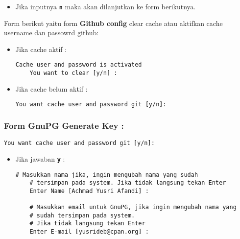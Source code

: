 {\begin{itemize}
\begin{lstlisting}[language=ShellBash]
	# Masukkan email github, jika ingin mengubah nama yang sudah
	# tersimpan pada system. Jika tidak langsung tekan Enter
	Enter your github email [linuxer08@gmail.com] : 
	
	# Jika cache sudah aktif, maka form berikut akan tampil
	# jika cache belum aktif, maka form yang tampil yaitu :
	# "You want cache user and password git [y/n]:"
	# 
	# Jawaban hanya "y" or "n", jika dikosongkan 
	# maka sama dengan "n"
	You want to clear [y/n] : 
	\end{lstlisting}
	
	\item Jika inputnya \textbf{\texttt{n}} maka akan dilanjutkan ke form berikutnya.
\end{itemize}

\noindent
Form berikut yaitu form \textbf{Github config} clear cache atau aktifkan cache username dan passowrd github:

\begin{itemize}
	\item Jika cache aktif :
	\begin{lstlisting}[language=ShellBash]
	Cache user and password is activated
	You want to clear [y/n] : 
	\end{lstlisting}
	
	\item Jika cache belum aktif :
	\begin{lstlisting}[language=ShellBash]
	You want cache user and password git [y/n]: 
	\end{lstlisting}
\end{itemize}

\subsubsection{Form GnuPG Generate Key :}

\begin{lstlisting}[language=ShellBash]
You want cache user and password git [y/n]: 
\end{lstlisting}

\begin{itemize}
	\item Jika jawaban \textbf{\texttt{y}} :
	\begin{lstlisting}[language=ShellBash]
	# Masukkan nama jika, ingin mengubah nama yang sudah
	# tersimpan pada system. Jika tidak langsung tekan Enter
	Enter Name [Achmad Yusri Afandi] : 
	
	# Masukkan email untuk GnuPG, jika ingin mengubah nama yang
	# sudah tersimpan pada system. 
	# Jika tidak langsung tekan Enter
	Enter E-mail [yusrideb@cpan.org] : 
	\end{lstlisting}
	

\end{itemize}}
